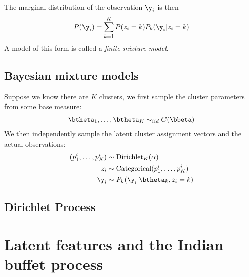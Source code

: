 \documentclass{article}
\begin{document}
The marginal distribution of the observation $\y_i$ is then
\begin{align}
P(\y_i) = \sum_{k=1}^K P(z_i = k) P_k(\y_i | z_i = k)
\end{align}
A model of this form is called a {\em{finite mixture model}}.

\subsection{Bayesian mixture models}
Suppose we know there are $K$ clusters, we first sample the cluster parameters from some base measure:
\begin{align}
\btheta_1, \dots, \btheta_K \sim_{iid} G(\bbeta)
\end{align}
We then independently sample the latent cluster assignment vectors and the actual observations:
\begin{align}
(p_1^i, \dots, p_K^i) &\sim \text{Dirichlet}_K(\alpha)\\
z_i &\sim \text{Categorical}(p_1^i, \dots, p_K^i)\\
\y_i &\sim P_k(\y_i | \btheta_k, z_i = k)
\end{align}

\subsection{Dirichlet Process}




\section{Latent features and the Indian buffet process}
\end{document}

